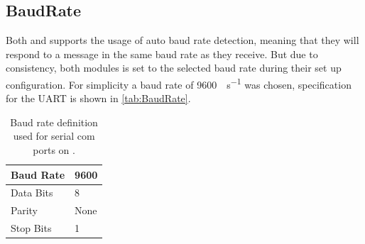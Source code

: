 
\subsection{BaudRate}
Both \SARA and \GPS supports the usage of auto baud rate detection, meaning that they will respond to a message in the same baud rate as they receive.
But due to consistency, both modules is set to the selected baud rate during their set up configuration. 
For simplicity a baud rate of \SI[per-mode = symbol]{9600}{\bit\per\second} was chosen, specification for the UART is shown in \vref{tab:BaudRate}.

\begin{table}[H]
	\begin{tabular}{ll}
		\hline 
		Baud Rate & 9600 \\ 
		\hline 
		Data Bits & 8 \\ 
		\hline 
		Parity & None \\ 
		\hline 
		Stop Bits & 1 \\ 
		\hline 
	\end{tabular}
	\centering
	\caption{Baud rate definition used for serial com ports on \SAMD.}
	\label{tab:BaudRate}
\end{table} 

\FloatBarrier